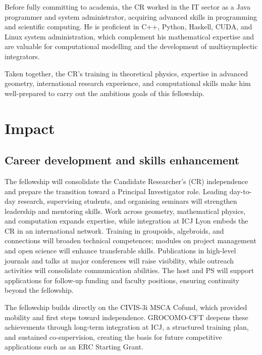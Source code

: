 \documentclass[11pt]{msca-pf}
\begin{document}
Before fully committing to academia, the CR worked in the IT sector as a Java programmer and system administrator, acquiring advanced skills in programming and scientific computing. He is proficient in C++, Python, Haskell, CUDA, and Linux system administration, which complement his mathematical expertise and are valuable for computational modelling and the development of multisymplectic integrators.

Taken together, the CR’s training in theoretical physics, expertise in advanced geometry, international research experience, and computational skills make him well-prepared to carry out the ambitious goals of this fellowship.


\section{Impact }
\label{sc:impact}


\subsection{Career development and skills enhancement}
\label{ssc:impact: career}

The fellowship will consolidate the Candidate Researcher’s (CR) independence and prepare the transition toward a Principal Investigator role. Leading day-to-day research, supervising students, and organising seminars will strengthen leadership and mentoring skills. Work across geometry, mathematical physics, and computation expands expertise, while integration at ICJ Lyon embeds the CR in an international network. Training in groupoids, algebroids, and connections will broaden technical competences; modules on project management and open science will enhance transferable skills. Publications in high-level journals and talks at major conferences will raise visibility, while outreach activities will consolidate communication abilities. The host and PS will support applications for follow-up funding and faculty positions, ensuring continuity beyond the fellowship.  

The fellowship builds directly on the CIVIS-3i MSCA Cofund, which provided mobility and first steps toward independence. GROCOMO-CFT deepens these achievements through long-term integration at ICJ, a structured training plan, and sustained co-supervision, creating the basis for future competitive applications such as an ERC Starting Grant.  
\end{document}
